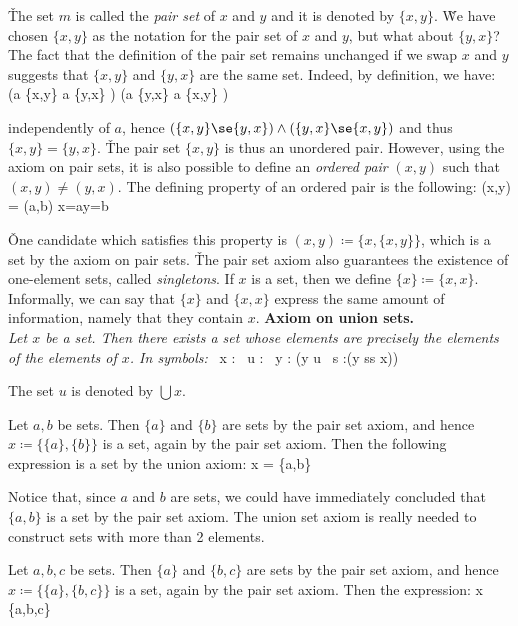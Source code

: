 \v

The set $m$ is called the \emph{pair set} of $x$ and $y$ and it is denoted by $\{x,y\}$. \v

We have chosen $\{x,y\}$ as the notation for the pair set of $x$ and $y$, but what about $\{y,x\}$? The fact that the
definition of the pair set remains unchanged if we swap $x$ and $y$ suggests that $\{x,y\}$ and $\{y,x\}$ are the
same set. Indeed, by definition, we have:
\bse
(a \in \{x,y\} \imp a \in \{y,x\} ) \land (a \in \{y,x\} \imp a \in \{x,y\} )
\ese

independently of $a$, hence $(\{x,y\} \se \{y,x\}) \land (\{y,x\} \se \{x, y\})$ and thus $\{x,y\} = \{y,x\}$. \v

The pair set $\{x,y\}$ is thus an unordered pair. However, using the axiom on pair sets, it is also possible to
define an \emph{ordered pair} $(x,y)$ such that $(x,y)\neq(y,x)$. The defining property of an ordered pair is the
following:
\bse
(x,y) = (a,b) \eqv x=a\land y=b
\ese

\v

One candidate which satisfies this property is $(x,y)\coloneqq\{x,\{x, y\}\}$, which is a set by the axiom on pair
sets. \v

The pair set axiom also guarantees the existence of one-element sets, called \emph{singletons}. If
$x$ is a set, then we define $\{x\}\coloneqq\{x,x\}$. Informally, we can say that $\{x\}$ and $\{x,x\}$ express the
same amount of information, namely that they contain $x$. \v

\textbf{Axiom on union sets.} \\
\emph{Let $x$ be a set. Then there exists a set whose elements are precisely the elements of the elements of $x$. In
symbols:}
\bse
\forall \, x : \exists \, u : \forall \, y : (y \in u \eqv \exists \, s :(y \in s\land s \in x))
\ese

The set $u$ is denoted by $\bigcup x$.

\be Let $a,b$ be sets. Then $\{a\}$ and $\{b\}$ are sets by the pair set axiom, and hence $x\coloneqq\{\{a\},\{b\}\}$
is a set, again by the pair set axiom. Then the following expression is a set by the union axiom:
\bse
\bigcup x = \{a,b\}
\ese
\ee

Notice that, since $a$ and $b$ are sets, we could have immediately concluded that $\{a,b\}$ is a set by the pair set
axiom. The union set axiom is really needed to construct sets with more than 2 elements.

\be
Let $a,b,c$ be sets. Then $\{a\}$ and $\{b,c\}$ are sets by the pair set axiom, and hence $x\coloneqq\{\{a\},\{b,
c\}\}$ is a set, again by the pair set axiom. Then the expression:
\bse
\bigcup x \eqqcolon \{a,b,c\}
\ese

